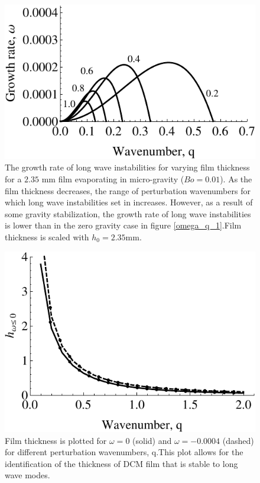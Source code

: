 \documentclass[a4paper,12pt]{article}
\begin{document}
  \begin{figure}
   \centering
   \includegraphics[width=\linewidth]{Fig26}
   \caption{The growth rate of long wave instabilities for varying film thickness for a $2.35$ mm film evaporating in micro-gravity ($Bo=0.01$). As the film thickness decreases, the range of perturbation wavenumbers for which long wave instabilities set in increases. However, as a result of some gravity stabilization, the growth rate of long wave instabilities is lower than in the zero gravity case in figure \ref{omega_q_1}.Film thickness is scaled with $h_0=2.35$mm.}
   \label{omega_q_2}
  \end{figure}


  \begin{figure}
   \centering
   \includegraphics[width=\linewidth]{Fig27_2}
   \caption{Film thickness is plotted for $\omega=0$ (solid) and $\omega=-0.0004$ (dashed) for different perturbation wavenumbers, q.This plot allows for the identification of the thickness of DCM film that is stable to long wave modes.}
   \label{h_vs_q}
  \end{figure}
\end{document}
